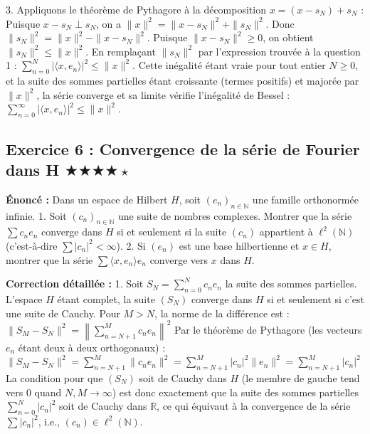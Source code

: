 \documentclass[11pt,a4paper]{article}
\begin{document}
3. Appliquons le théorème de Pythagore à la décomposition $x = (x - s_N) + s_N$ :
   Puisque $x - s_N \perp s_N$, on a $\|x\|^2 = \|x - s_N\|^2 + \|s_N\|^2$.
   Donc $\|s_N\|^2 = \|x\|^2 - \|x - s_N\|^2$.
   Puisque $\|x - s_N\|^2 \geq 0$, on obtient $\|s_N\|^2 \leq \|x\|^2$.
   En remplaçant $\|s_N\|^2$ par l'expression trouvée à la question 1 :
   $\sum_{n=0}^N |\langle x, e_n \rangle|^2 \leq \|x\|^2$.
   Cette inégalité étant vraie pour tout entier $N \geq 0$, et la suite des sommes partielles étant croissante (termes positifs) et majorée par $\|x\|^2$, la série converge et sa limite vérifie l'inégalité de Bessel :
   $\sum_{n=0}^\infty |\langle x, e_n \rangle|^2 \leq \|x\|^2$.


\subsection*{Exercice 6 : Convergence de la série de Fourier dans H $\bigstar\bigstar\bigstar\bigstar\star$}

\textbf{Énoncé :}
Dans un espace de Hilbert $H$, soit $(e_n)_{n \in \mathbb{N}}$ une famille orthonormée infinie.
1. Soit $(c_n)_{n \in \mathbb{N}}$ une suite de nombres complexes. Montrer que la série $\sum c_n e_n$ converge dans $H$ si et seulement si la suite $(c_n)$ appartient à $\ell^2(\mathbb{N})$ (c'est-à-dire $\sum |c_n|^2 < \infty$).
2. Si $(e_n)$ est une base hilbertienne et $x \in H$, montrer que la série $\sum \langle x, e_n \rangle e_n$ converge vers $x$ dans $H$.

\textbf{Correction détaillée :}
1. Soit $S_N = \sum_{n=0}^N c_n e_n$ la suite des sommes partielles. L'espace $H$ étant complet, la suite $(S_N)$ converge dans $H$ si et seulement si c'est une suite de Cauchy.
   Pour $M > N$, la norme de la différence est :
   $\|S_M - S_N\|^2 = \left\| \sum_{n=N+1}^M c_n e_n \right\|^2$
   Par le théorème de Pythagore (les vecteurs $e_n$ étant deux à deux orthogonaux) :
   $\|S_M - S_N\|^2 = \sum_{n=N+1}^M \|c_n e_n\|^2 = \sum_{n=N+1}^M |c_n|^2 \|e_n\|^2 = \sum_{n=N+1}^M |c_n|^2$
   La condition pour que $(S_N)$ soit de Cauchy dans $H$ (le membre de gauche tend vers 0 quand $N, M \to \infty$) est donc exactement que la suite des sommes partielles $\sum_{n=0}^N |c_n|^2$ soit de Cauchy dans $\mathbb{R}$, ce qui équivaut à la convergence de la série $\sum |c_n|^2$, i.e., $(c_n) \in \ell^2(\mathbb{N})$.
\end{document}
